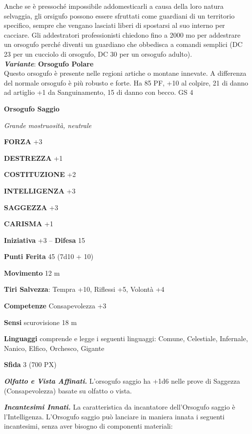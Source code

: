 \begin{multicols}{2}
Anche se è pressoché impossibile addomesticarli a causa della loro natura selvaggia, gli orsigufo possono essere sfruttati come guardiani di un territorio specifico, sempre che vengano lasciati liberi di spostarsi al suo interno per cacciare. Gli addestratori professionisti chiedono fino a 2000 mo per addestrare un orsogufo perché diventi un guardiano che obbedisca a comandi semplici (DC 23 per un cucciolo di orsogufo, DC 30 per un orsogufo adulto).\\

\textit{\textbf{Variante}}: \textbf{Orsogufo Polare}\\
Questo orsogufo è presente nelle regioni artiche o montane innevate. A differenza del normale orsogufo è più robusto e forte. Ha 85 PF, +10 al colpire, 21 di danno ad artiglio +1 da Sanguinamento, 15 di danno con becco. GS 4

\medskip{}\textbf{Orsogufo Saggio}

\textit{Grande mostruosità, neutrale}

\textbf{FORZA} +3

\textbf{DESTREZZA} +1

\textbf{COSTITUZIONE} +2

\textbf{INTELLIGENZA} +3

\textbf{SAGGEZZA} +3

\textbf{CARISMA} +1

\textbf{Iniziativa} +3 -- \textbf{Difesa} 15

\textbf{Punti Ferita} 45 (7d10 + 10)

\textbf{Movimento} 12 m

\textbf{Tiri Salvezza}: Tempra +10, Riflessi +5, Volontà +4

\textbf{Competenze} Consapevolezza +3

\textbf{Sensi} scurovisione 18 m

\textbf{Linguaggi} comprende e legge i seguenti linguaggi: Comune, Celestiale, Infernale, Nanico, Elfico, Orchesco, Gigante

\textbf{Sfida} 3 (700 PX)

\textit{\textbf{Olfatto e Vista Affinati.}} L'orsogufo saggio ha +1d6 nelle prove di Saggezza (Consapevolezza) basate su olfatto o vista.

\textit{\textbf{Incantesimi Innati.}} La caratteristica da incantatore dell'Orsogufo saggio è l'Intelligenza. L'Orsogufo saggio può lanciare in maniera innata i seguenti incantesimi, senza aver bisogno di componenti materiali:


\end{multicols}
